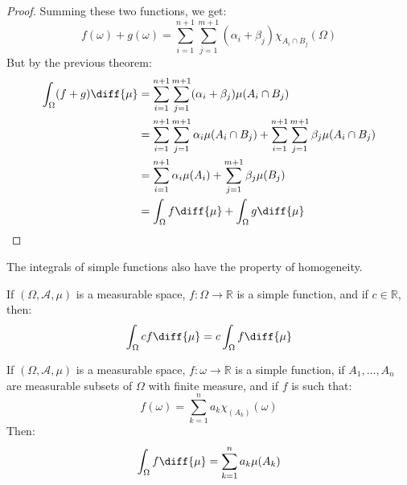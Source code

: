\begin{proof}
        Summing these two functions, we get:
        \begin{equation}
            f(\omega)+g(\omega)=
            \sum_{i=1}^{n+1}\sum_{j=1}^{m+1}
                (\alpha_{i}+\beta_{j})
                \chi_{A_{i}\cap{B}_{j}}(\Omega)
        \end{equation}
        But by the previous theorem:
        \begin{align}
            \int_{\Omega}(f+g)\diff{\mu}
            &=\sum_{i=1}^{n+1}\sum_{j=1}^{m+1}
                (\alpha_{i}+\beta_{j})
                \mu(A_{i}\cap{B}_{j})\\
            &=\sum_{i=1}^{n+1}\sum_{j=1}^{m+1}
                \alpha_{i}\mu(A_{i}\cap{B}_{j})+
                \sum_{i=1}^{n+1}\sum_{j=1}^{m+1}
                \beta_{j}\mu(A_{i}\cap{B}_{j})\\
            &=\sum_{i=1}^{n+1}\alpha_{i}\mu(A_{i})+
                \sum_{j=1}^{m+1}\beta_{j}\mu(B_{j})\\
            &=\int_{\Omega}f\diff{\mu}+
                \int_{\Omega}g\diff{\mu}
        \end{align}
    \end{proof}
    The integrals of simple functions also have the
    property of homogeneity.
    \begin{theorem}
        If $(\Omega,\mathcal{A},\mu)$ is a measurable
        space, $f:\Omega\rightarrow\mathbb{R}$ is
        a simple function, and if $c\in\mathbb{R}$,
        then:
        \begin{equation}
            \int_{\Omega}cf\diff{\mu}=
            c\int_{\Omega}f\diff{\mu}
        \end{equation}
    \end{theorem}
    \begin{theorem}
        If $(\Omega,\mathcal{A},\mu)$ is a measurable
        space, $f:\omega\rightarrow\mathbb{R}$ is
        a simple function, if $A_{1},\dots,A_{n}$
        are measurable subsets of $\Omega$ with
        finite measure, and if $f$ is such that:
        \begin{equation}
            f(\omega)=\sum_{k=1}^{n}a_{k}
                \chi_(A_{k})(\omega)
        \end{equation}
        Then:
        \begin{equation}
            \int_{\Omega}f\diff{\mu}=
            \sum_{k=1}^{n}a_{k}\mu(A_{k})
        \end{equation}
    \end{theorem}
